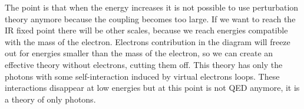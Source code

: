 \documentclass[../main.tex]{subfiles}
\begin{document}
The point is that when the energy increases it is not possible to use perturbation theory anymore because the coupling becomes too large. If we want to reach the IR fixed point there will be other scales, because we reach energies compatible with the mass of the electron. Electrons contribution in the diagram will freeze out for energies smaller than the mass of the electron, so we can create an effective theory without electrons, cutting them off. This theory has only the photons with some self-interaction induced by virtual electrons loops. These interactions disappear at low energies but at this point is not QED anymore, it is a theory of only photons.\\
\end{document}
